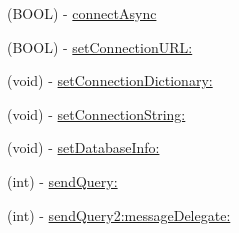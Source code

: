 {\bf }\par
\begin{DoxyCompactItemize}
\item 
(B\+O\+O\+L) -\/ \hyperlink{interface_p_g_t_s_connection_a760a7f71e81b8b38e97d0fa06e877f10}{connect\+Async}
\end{DoxyCompactItemize}

{\bf }\par
\begin{DoxyCompactItemize}
\item 
(B\+O\+O\+L) -\/ \hyperlink{interface_p_g_t_s_connection_a34a225a33c9a2ae107fdcc21303b7371}{set\+Connection\+U\+R\+L\+:}
\item 
(void) -\/ \hyperlink{interface_p_g_t_s_connection_aae94caf61241aca0a02175a5f024d282}{set\+Connection\+Dictionary\+:}
\item 
(void) -\/ \hyperlink{interface_p_g_t_s_connection_a9498870ef37387d3d26dc40f5364bdbb}{set\+Connection\+String\+:}
\end{DoxyCompactItemize}

{\bf }\par

{\bf }\par

{\bf }\par

{\bf }\par
\begin{DoxyCompactItemize}
\item 
(void) -\/ \hyperlink{interface_p_g_t_s_connection_abffc8fbb7c1b51a6fff0e52673589671}{set\+Database\+Info\+:}
\end{DoxyCompactItemize}

{\bf }\par

{\bf }\par

{\bf }\par

{\bf }\par
\begin{DoxyCompactItemize}
\item 
(int) -\/ \hyperlink{interface_p_g_t_s_connection_a4376dcad5b13ea495f9237a26453642f}{send\+Query\+:}
\end{DoxyCompactItemize}

{\bf }\par
\begin{DoxyCompactItemize}
\item 
(int) -\/ \hyperlink{interface_p_g_t_s_connection_abd70fb6ce175a5fb0be26aae29e0e6af}{send\+Query2\+:message\+Delegate\+:}
\end{DoxyCompactItemize}


